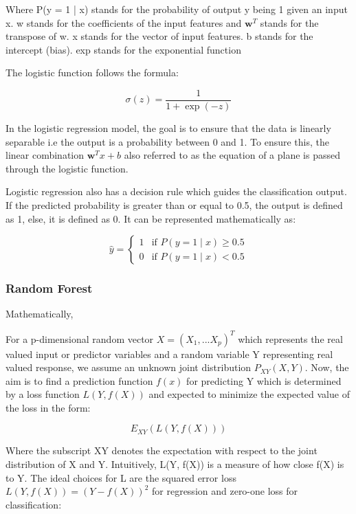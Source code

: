 \documentclass[12pt, a4paper,twoside]{report}
\numberwithin{equation}{chapter}
\begin{document}
Where P(y = 1 | x) stands for the probability of output y being 1 given an input x. w stands for the coefficients of the input features and \(\mathbf{w}^T\) stands for the transpose of w. x stands for the vector of input features. b stands for the intercept (bias). exp stands for the exponential function

The logistic function follows the formula:

\[\sigma(z) = \frac{1}{1+\exp({-z})}\]

In the logistic regression model, the goal is to ensure that the data is linearly separable i.e the output is a probability between 0 and 1. To ensure this, the linear combination \(\mathbf{w}^Tx + b\) also referred to as the equation of a plane is passed through the logistic function. 

Logistic regression also has a decision rule which guides the classification output. If the predicted probability is greater than or equal to 0.5, the output is defined as 1, else, it is defined as 0. It can be represented mathematically as:

\[\hat{y} = \begin{cases} 1 & \text{if } P(y = 1 \mid x) \geq 0.5 \\ 0 & \text{if } P(y = 1 \mid x) < 0.5 \end{cases} \]

\subsubsection{Random Forest}

Mathematically,

For a p-dimensional random vector \(X = (X_1,...X_p)^T\) which represents the real valued input or predictor variables and a random variable Y representing real valued response, we assume an unknown joint distribution \(P_{XY} (X, Y)\).  Now, the aim is to find a prediction function \(f(x)\) for predicting Y which is determined by a loss function \(L(Y, f(X))\) and expected to minimize the expected value of the loss in the form:  

\[E_{XY} (L(Y, f(X)))\]

Where the subscript XY denotes the expectation with respect to the joint distribution of X and Y. Intuitively, L(Y, f(X)) is a measure of how close f(X) is to Y. The ideal choices for L are the squared error loss \(L(Y, f(X)) = (Y - f(X))^2\) for regression and zero-one loss for classification:
\end{document}
